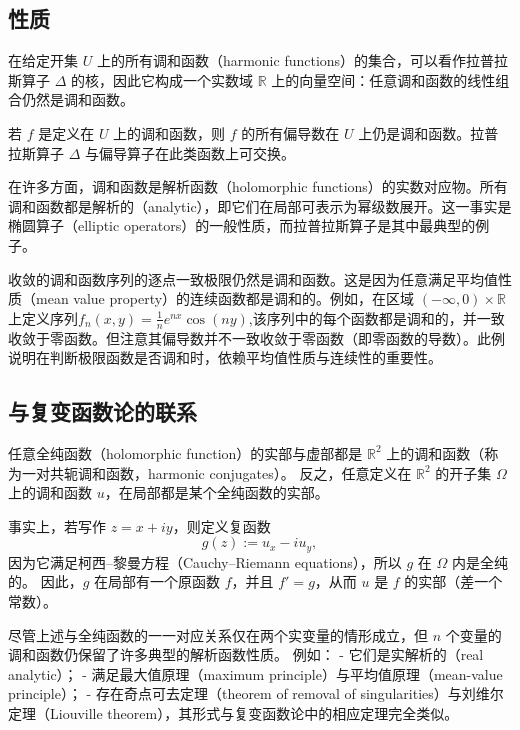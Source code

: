 \subsection{性质}
在给定开集 \( U \) 上的所有调和函数（harmonic functions）的集合，可以看作拉普拉斯算子 \(\Delta\) 的核，因此它构成一个实数域 \(\mathbb{R}\) 上的向量空间：任意调和函数的线性组合仍然是调和函数。

若 \( f \) 是定义在 \( U \) 上的调和函数，则 \( f \) 的所有偏导数在 \( U \) 上仍是调和函数。拉普拉斯算子 \(\Delta\) 与偏导算子在此类函数上可交换。

在许多方面，调和函数是解析函数（holomorphic functions）的实数对应物。所有调和函数都是解析的（analytic），即它们在局部可表示为幂级数展开。这一事实是椭圆算子（elliptic operators）的一般性质，而拉普拉斯算子是其中最典型的例子。

收敛的调和函数序列的逐点一致极限仍然是调和函数。这是因为任意满足平均值性质（mean value property）的连续函数都是调和的。例如，在区域 \((-\infty, 0) \times \mathbb{R}\) 上定义序列$f_{n}(x,y) = \frac{1}{n} e^{nx} \cos(ny)$,该序列中的每个函数都是调和的，并一致收敛于零函数。但注意其偏导数并不一致收敛于零函数（即零函数的导数）。此例说明在判断极限函数是否调和时，依赖平均值性质与连续性的重要性。
\subsection{与复变函数论的联系}
任意全纯函数（holomorphic function）的实部与虚部都是 \(\mathbb{R}^2\) 上的调和函数（称为一对共轭调和函数，harmonic conjugates）。  
反之，任意定义在 \(\mathbb{R}^2\) 的开子集 \(\Omega\) 上的调和函数 \(u\)，在局部都是某个全纯函数的实部。

事实上，若写作 \( z = x + i y \)，则定义复函数
\[
g(z) := u_x - i u_y,
\]
因为它满足柯西–黎曼方程（Cauchy–Riemann equations），所以 \( g \) 在 \(\Omega\) 内是全纯的。  
因此，\( g \) 在局部有一个原函数 \( f \)，并且 \( f' = g \)，从而 \( u \) 是 \( f \) 的实部（差一个常数）。

尽管上述与全纯函数的一一对应关系仅在两个实变量的情形成立，但 \( n \) 个变量的调和函数仍保留了许多典型的解析函数性质。  
例如：  
- 它们是实解析的（real analytic）；  
- 满足最大值原理（maximum principle）与平均值原理（mean-value principle）；  
- 存在奇点可去定理（theorem of removal of singularities）与刘维尔定理（Liouville theorem），其形式与复变函数论中的相应定理完全类似。
